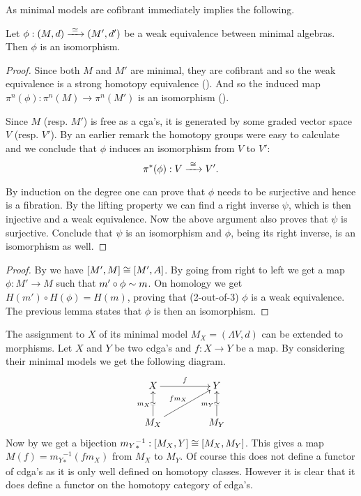 As minimal models are cofibrant  immediately implies the following.


\begin{lemma}
	Let $\phi: (M, d) \xrightarrow{\,\,{\simeq}\,\,} (M', d')$ be a weak equivalence between minimal algebras. Then $\phi$ is an isomorphism.
\end{lemma}
\begin{proof}
	Since both $M$ and $M'$ are minimal, they are cofibrant and so the weak equivalence is a strong homotopy equivalence (). And so the induced map $\pi^n(\phi) : \pi^n(M) \to \pi^n(M')$ is an isomorphism ().

	Since $M$ (resp. $M'$) is free as a cga's, it is generated by some graded vector space $V$ (resp. $V'$). By an earlier remark the homotopy groups were easy to calculate and we conclude that $\phi$ induces an isomorphism from $V$ to $V'$:
	\[ \pi^\ast(\phi) : V \xrightarrow{\,\,{\cong}\,\,} V'. \]

	By induction on the degree one can prove that $\phi$ needs to be surjective and hence is a fibration. By the lifting property we can find a right inverse $\psi$, which is then injective and a weak equivalence. Now the above argument also proves that $\psi$ is surjective. Conclude that $\psi$ is an isomorphism and $\phi$, being its right inverse, is an isomorphism as well.
\end{proof}

\begin{proof}
	By  we have $[M', M] \cong [M', A]$. By going from right to left we get a map $\phi: M' \to M$ such that $m' \circ \phi \sim m$. On homology we get $H(m') \circ H(\phi) = H(m)$, proving that (2-out-of-3) $\phi$ is a weak equivalence. The previous lemma states that $\phi$ is then an isomorphism.
\end{proof}

The assignment to $X$ of its minimal model $M_X = (\Lambda V, d)$ can be extended to morphisms. Let $X$ and $Y$ be two cdga's and $f: X \to Y$ be a map. By considering their minimal models we get the following diagram.
\begin{displaymath}
	\xymatrix @C=1.5cm{
	X \ar[r]^f & Y \\
	M_X \arwe[u]^{m_X} \ar[ur]^{f m_X} & M_Y \arwe[u]^{m_Y}
	}
\end{displaymath}
Now by  we get a bijection ${m_Y}_\ast^{-1} : [M_X, Y] \cong [M_X, M_Y]$. This gives a map $M(f) = {m_Y}_\ast^{-1} (f m_X)$ from $M_X$ to $M_Y$. Of course this does not define a functor of cdga's as it is only well defined on homotopy classes. However it is clear that it does define a functor on the homotopy category of cdga's.

